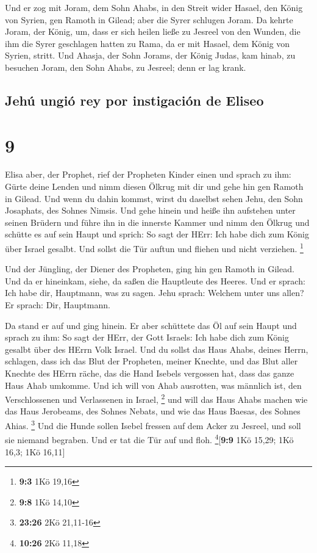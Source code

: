  Und er zog mit Joram, dem Sohn Ahabs, in den Streit
wider Hasael, den König von Syrien, gen Ramoth in Gilead; aber die Syrer
schlugen Joram.  Da kehrte Joram, der König, um, dass er
sich heilen ließe zu Jesreel von den Wunden, die ihm die Syrer
geschlagen hatten zu Rama, da er mit Hasael, dem König von Syrien,
stritt. Und Ahasja, der Sohn Jorams, der König Judas, kam hinab, zu
besuchen Joram, den Sohn Ahabs, zu Jesreel; denn er lag krank.

\hypertarget{jehuxfa-ungiuxf3-rey-por-instigaciuxf3n-de-eliseo}{%
\subsection{Jehú ungió rey por instigación de
Eliseo}\label{jehuxfa-ungiuxf3-rey-por-instigaciuxf3n-de-eliseo}}

\hypertarget{section-8}{%
\section{9}\label{section-8}}

 Elisa aber, der Prophet, rief der Propheten Kinder einen
und sprach zu ihm: Gürte deine Lenden und nimm diesen Ölkrug mit dir und
gehe hin gen Ramoth in Gilead.  Und wenn du dahin kommst,
wirst du daselbst sehen Jehu, den Sohn Josaphats, des Sohnes Nimsis. Und
gehe hinein und heiße ihn aufstehen unter seinen Brüdern und führe ihn
in die innerste Kammer  und nimm den Ölkrug und schütte es
auf sein Haupt und sprich: So sagt der HErr: Ich habe dich zum König
über Israel gesalbt. Und sollst die Tür auftun und fliehen und nicht
verziehen. \footnote{\textbf{9:3} 1Kö 19,16}

 Und der Jüngling, der Diener des Propheten, ging hin gen
Ramoth in Gilead.  Und da er hineinkam, siehe, da saßen
die Hauptleute des Heeres. Und er sprach: Ich habe dir, Hauptmann, was
zu sagen. Jehu sprach: Welchem unter uns allen? Er sprach: Dir,
Hauptmann.

 Da stand er auf und ging hinein. Er aber schüttete das Öl
auf sein Haupt und sprach zu ihm: So sagt der HErr, der Gott Israels:
Ich habe dich zum König gesalbt über des HErrn Volk Israel.
 Und du sollst das Haus Ahabs, deines Herrn, schlagen,
dass ich das Blut der Propheten, meiner Knechte, und das Blut aller
Knechte des HErrn räche, das die Hand Isebels vergossen hat,
 dass das ganze Haus Ahab umkomme. Und ich will von Ahab
ausrotten, was männlich ist, den Verschlossenen und Verlassenen in
Israel, \footnote{\textbf{9:8} 1Kö 14,10}  und will das
Haus Ahabs machen wie das Haus Jerobeams, des Sohnes Nebats, und wie das
Haus Baesas, des Sohnes Ahias. \footnote{\textbf{23:26} 2Kö 21,11-16}
 Und die Hunde sollen Isebel fressen auf dem Acker zu
Jesreel, und soll sie niemand begraben. Und er tat die Tür auf und floh.
\footnote{\textbf{10:26} 2Kö 11,18}{[}\textbf{9:9} 1Kö 15,29; 1Kö 16,3;
1Kö 16,11{]}

